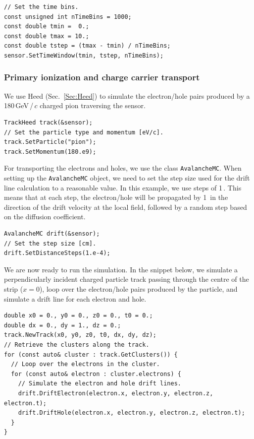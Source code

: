 \begin{lstlisting}
// Set the time bins.
const unsigned int nTimeBins = 1000;
const double tmin =  0.;
const double tmax = 10.;
const double tstep = (tmax - tmin) / nTimeBins;
sensor.SetTimeWindow(tmin, tstep, nTimeBins);
\end{lstlisting}

\subsubsection{Primary ionization and charge carrier transport}

We use Heed (Sec.~\ref{Sec:Heed}) to simulate the electron/hole pairs 
produced by a 180\,GeV\,/\,$c$ charged pion traversing the sensor.
\begin{lstlisting}
TrackHeed track(&sensor);
// Set the particle type and momentum [eV/c].
track.SetParticle("pion");
track.SetMomentum(180.e9);
\end{lstlisting}
For transporting the electrons and holes, we use the class \texttt{AvalancheMC}. 
When setting up the \texttt{AvalancheMC} object, 
we need to set the step size used for the drift line calculation 
to a reasonable value. In this example, we use steps of 1\,. 
This means that at each step, the electron/hole will be propagated by 
1\, in the direction of the drift velocity at the local field, 
followed by a random step based on the diffusion coefficient.
\begin{lstlisting}
AvalancheMC drift(&sensor);
// Set the step size [cm].
drift.SetDistanceSteps(1.e-4);
\end{lstlisting}
We are now ready to run the simulation. In the snippet below, 
we simulate a perpendicularly incident charged particle track 
passing through the centre of the strip ($x = 0$), 
loop over the electron/hole pairs produced by the particle, 
and simulate a drift line for each electron and hole.
\begin{lstlisting}
double x0 = 0., y0 = 0., z0 = 0., t0 = 0.;
double dx = 0., dy = 1., dz = 0.; 
track.NewTrack(x0, y0, z0, t0, dx, dy, dz);
// Retrieve the clusters along the track.
for (const auto& cluster : track.GetClusters()) {
  // Loop over the electrons in the cluster.
  for (const auto& electron : cluster.electrons) {
    // Simulate the electron and hole drift lines.
    drift.DriftElectron(electron.x, electron.y, electron.z, electron.t);
    drift.DriftHole(electron.x, electron.y, electron.z, electron.t);
  }
}
\end{lstlisting}
